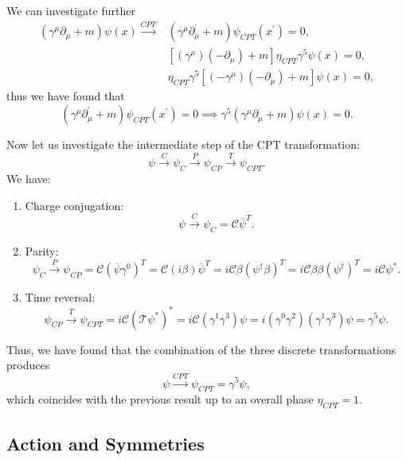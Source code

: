 We can investigate further
\[
    \begin{aligned}
        (\gamma^{\mu}\partial_\mu + m)\psi(x) \xrightarrow{CPT} & (\gamma^{\mu}\partial_\mu^{\prime} + m) \psi_{CPT}(x^{\prime}) = 0,   \\
                                                                & [(\gamma^{\mu})(-\partial_\mu) + m] \eta_{CPT} \gamma^5 \psi(x) = 0,  \\
                                                                & \eta_{CPT} \gamma^5 [(-\gamma^{\mu})(-\partial_\mu) + m] \psi(x) = 0,
    \end{aligned}
\]
thus we have found that
\[
    (\gamma^{\mu}\partial_\mu^{\prime} + m) \psi_{CPT}(x^{\prime}) = 0 \implies \gamma^5 (\gamma^{\mu}\partial_\mu + m) \psi(x) = 0.
\]

Now let us investigate the intermediate step of the CPT transformation:
\[
    \psi \xrightarrow{C} \psi_{C} \xrightarrow{P} \psi_{CP} \xrightarrow{T} \psi_{CPT}.
\]
We have:
\begin{enumerate}
    \item Charge conjugation:
          \[
              \psi \xrightarrow{C} \psi_C = \mathcal{C} \overline{\psi}^T.
          \]
    \item Parity:
          \[
              \psi_C \xrightarrow{P} \psi_{CP} = \mathcal{C} (\overline{\psi} \gamma^0)^T = \mathcal{C} (i\beta) \overline{\psi}^T = i\mathcal{C} \beta (\psi^{\dagger} \beta)^T = i \mathcal{C} \beta \beta (\psi^{\dagger})^T = i \mathcal{C} \psi^*.
          \]
    \item Time reversal:
          \[
              \psi_{CP} \xrightarrow{T} \psi_{CPT} = i \mathcal{C} (\mathcal{T} \psi^*)^* = i \mathcal{C} (\gamma^1 \gamma^3) \psi = i (\gamma^0 \gamma^2)(\gamma^1 \gamma^3) \psi = \gamma^5 \psi.
          \]
\end{enumerate}
Thus, we have found that the combination of the three discrete transformations produces
\[
    \psi \xrightarrow{CPT} \psi_{CPT} = \gamma^5 \psi,
\]
which coincides with the previous result up to an overall phase \(\eta_{CPT} = 1\).

\subsection{Action and Symmetries}


